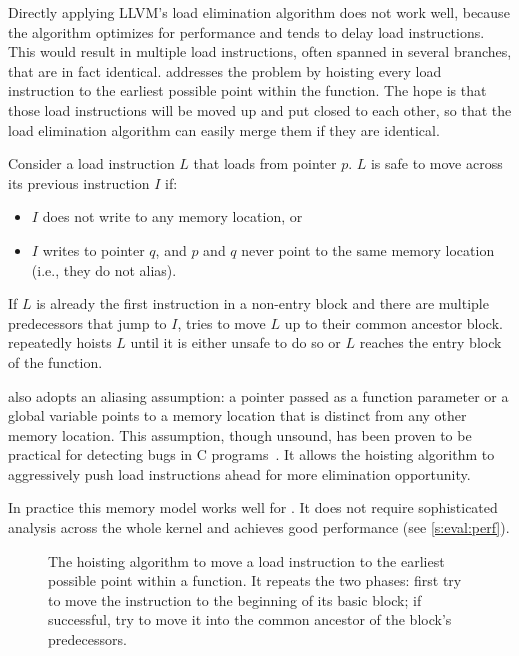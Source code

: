 Directly applying LLVM's load elimination algorithm does not work
well, because the algorithm optimizes for performance and tends to
delay load instructions.  This would result in multiple load
instructions, often spanned in several branches, that are in fact
identical.
%
\sys addresses the problem by hoisting every load instruction to
the earliest possible point within the function.  The hope is that
those load instructions will be moved up and put closed to each
other, so that the load elimination algorithm can easily merge them
if they are identical.

Consider a load instruction $L$ that loads from pointer $p$.  $L$ is
safe to move across its previous instruction $I$ if:
\begin{itemize}
\item $I$ does not write to any memory location, or
\item $I$ writes to pointer $q$, and $p$ and $q$ never point to the
same memory location (i.e., they do not alias).
\end{itemize}

If $L$ is already the first instruction in a non-entry block and
there are multiple predecessors that jump to $I$, \sys tries to
move $L$ up to their common ancestor block.  \sys repeatedly hoists $L$
until it is either unsafe to do so or $L$ reaches the entry block of the
function.

\sys also adopts an aliasing assumption: a pointer passed as a
function parameter or a global variable points to a memory location
that is distinct from any other memory location.  This assumption,
though unsound, has been proven to be practical for detecting bugs
in C programs~\cite{livshits:ipssa}.  It allows the hoisting algorithm
to aggressively push load instructions ahead for more elimination
opportunity.

In practice this memory model works well for \sys.
It does not require sophisticated analysis across the whole kernel
and achieves good performance (see \autoref{s:eval:perf}).

\begin{figure}

\caption{The hoisting algorithm to move a load instruction to the
earliest possible point within a function.  It repeats the two
phases: first try to move the instruction to the beginning of its
basic block; if successful, try to move it into the common ancestor
of the block's predecessors.}
\label{f:hoist}
\end{figure}
\fi


